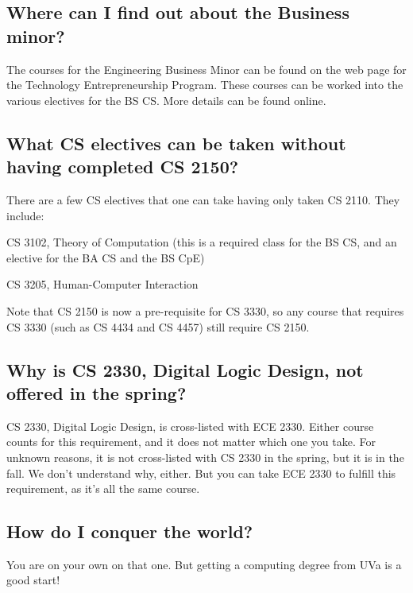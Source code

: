 \subsection{Where can I find out about the Business minor?}

The courses for the Engineering Business Minor can be found on the web
page for the Technology Entrepreneurship Program.  These courses can
be worked into the various electives for the BS CS. More details can
be found online.


\subsection{What CS electives can be taken without having completed CS
  2150?}

There are a few CS electives that one can take having only taken CS
2110.  They include:
\begin{itemlist}
\item CS 3102, Theory of Computation (this is a required class for the
  BS CS, and an elective for the BA CS and the BS CpE)
\item CS 3205, Human-Computer Interaction
\end{itemlist}

Note that CS 2150 is now a pre-requisite for CS 3330, so any course
that requires CS 3330 (such as CS 4434 and CS 4457) still require CS
2150.

\subsection{Why is CS 2330, Digital Logic Design, not offered
  in the spring?}
\label{cs2330}

CS 2330, Digital Logic Design, is cross-listed with ECE 2330.  Either
course counts for this requirement, and it does not matter which one
you take.  For unknown reasons, it is not cross-listed with CS 2330 in
the spring, but it is in the fall.  We don't understand why, either.
But you can take ECE 2330 to fulfill this requirement, as it's all the
same course.

\subsection{How do I conquer the world?}

You are on your own on that one.  But getting a computing degree from
UVa is a good start!


